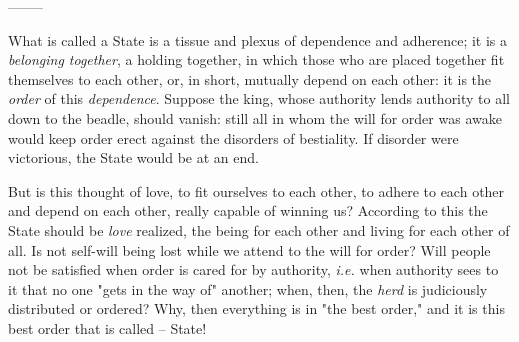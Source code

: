 \begin{center}
--------\end{center}


What is called a State is a tissue and plexus of dependence and adherence; it 
is a \textit{belonging together}, a holding together, in which those who are 
placed together fit themselves to each other, or, in short, mutually depend on 
each other: it is the \textit{order} of this \textit{dependence}. Suppose the 
king, whose authority lends authority to all down to the beadle, should 
vanish: still all in whom the will for order was awake would keep order erect 
against the disorders of bestiality. If disorder were victorious, the State 
would be at an end.

But is this thought of love, to fit ourselves to each other, to adhere to each 
other and depend on each other, really capable of winning us? According to 
this the State should be \textit{love} realized, the being for each other and 
living for each other of all. Is not self-will being lost while we attend to 
the will for order? Will people not be satisfied when order is cared for by 
authority, \textit{i.e.} when authority sees to it that no one "{}gets in the 
way of"{} another; when, then, the \textit{herd} is judiciously distributed or 
ordered? Why, then everything is in "{}the best order,"{} and it is this best 
order that is called -- State!

